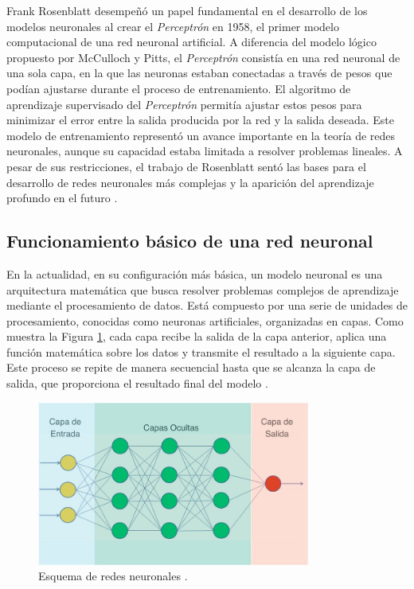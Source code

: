 Frank Rosenblatt desempeñó un papel fundamental en el desarrollo de los modelos neuronales al crear el \textit{Perceptrón} en 1958, el primer modelo computacional de una red neuronal artificial. A diferencia del modelo lógico propuesto por McCulloch y Pitts, el \textit{Perceptrón} consistía en una red neuronal de una sola capa, en la que las neuronas estaban conectadas a través de pesos que podían ajustarse durante el proceso de entrenamiento. El algoritmo de aprendizaje supervisado del \textit{Perceptrón} permitía ajustar estos pesos para minimizar el error entre la salida producida por la red y la salida deseada. Este modelo de entrenamiento representó un avance importante en la teoría de redes neuronales, aunque su capacidad estaba limitada a resolver problemas lineales. A pesar de sus restricciones, el trabajo de Rosenblatt sentó las bases para el desarrollo de redes neuronales más complejas y la aparición del aprendizaje profundo en el futuro \cite{rosenblatt1958perceptron}.


\subsection{Funcionamiento básico de una red neuronal}
En la actualidad, en su configuración más básica, un modelo neuronal es una arquitectura matemática que busca resolver problemas complejos de aprendizaje mediante el procesamiento de datos. Está compuesto por una serie de unidades de procesamiento, conocidas como neuronas artificiales, organizadas en capas. Como muestra la Figura \ref{fig:esq-capas}, cada capa recibe la salida de la capa anterior, aplica una función matemática sobre los datos y transmite el resultado a la siguiente capa. Este proceso se repite de manera secuencial hasta que se alcanza la capa de salida, que proporciona el resultado final del modelo \cite{bishop2006pattern}.

\begin{figure}[H]
    \centering
    \includegraphics[width=0.8\textwidth]{./img/modelo/capas.png}
    \caption{Esquema de redes neuronales \cite{aprendeia2021deep}.}
    \label{fig:esq-capas}
\end{figure}

